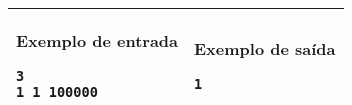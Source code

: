 \begin{table}[!h]
\centering
\begin{tabular}{|l|l|}
\hline
\begin{minipage}[t]{3in}
\textbf{Exemplo de entrada}
\begin{verbatim}
3
1 1 100000
\end{verbatim}
\vspace{1mm}
\end{minipage}
&
\begin{minipage}[t]{3in}
\textbf{Exemplo de saída}
\begin{verbatim}
1
\end{verbatim}
\vspace{1mm}
\end{minipage} \\
\hline
\end{tabular}
\end{table}
